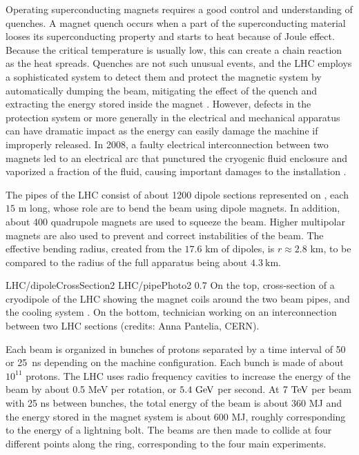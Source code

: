     Operating superconducting magnets requires a good control and understanding of quenches.
    A magnet quench occurs when a part of the superconducting material looses its superconducting
    property and starts to heat because of Joule effect. Because the critical temperature
    is usually low, this can create a chain reaction as the heat spreads. Quenches are
    not such unusual events, and the LHC employs a sophisticated system to detect them and protect
    the magnetic system by automatically dumping the beam, mitigating the effect of the
    quench and extracting the energy stored inside the magnet \cite{LHCmagnets}.
    However, defects in the protection
    system or more generally in the electrical and mechanical apparatus can have dramatic
    impact as the energy can easily damage the machine if improperly released. In 2008,
    a faulty electrical interconnection between two magnets led to an electrical arc that
    punctured the cryogenic fluid enclosure and vaporized a fraction of the fluid, causing
    important damages to the installation \cite{LHCindicent}.

    The pipes of the LHC consist of about 1200 dipole sections represented on
    , each $15$ m long, whose role are to bend the beam using dipole
    magnets. In addition, about 400 quadrupole magnets are used to squeeze the
    beam. Higher multipolar magnets are also used to prevent and correct instabilities of
    the beam. The effective bending radius, created from the $17.6$ km of dipoles, is
    $r \approx 2.8$ km, to be compared to the radius of the full apparatus being about $4.3~\text{km}$.

                     {LHC/dipoleCrossSection2}
                     {LHC/pipePhoto2}
                     {0.7}
                     {On the top, cross-section of a cryodipole of the LHC
                     showing the magnet coils around the two beam pipes, and the cooling system \cite{LHC}.
                     On the bottom, technician working on an interconnection between two LHC
                     sections (credits: Anna Pantelia, CERN).}

    Each beam is organized in bunches of protons separated by a time interval of 50 or
    25~ns depending on the machine configuration. Each bunch is made of about $10^{11}$
    protons. The LHC uses radio frequency cavities to increase the energy of the beam by
    about 0.5 MeV per rotation, or $5.4~\text{GeV}$ per second. At $7~\text{TeV}$ per beam with 25 ns
    between bunches, the total energy of the beam is about 360 MJ and the energy stored
    in the magnet system is about 600 MJ, roughly corresponding to the energy of a
    lightning bolt. The beams are then made to collide at four different points along the
    ring, corresponding to the four main experiments.

